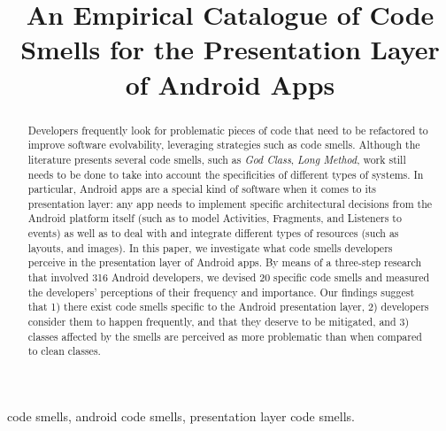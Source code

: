 \documentclass[conference]{IEEEtran}
\begin{document}
\title{An Empirical Catalogue of Code Smells for the Presentation Layer of Android Apps}

\author{
\and
{}
\and
{}
}

\maketitle

\begin{abstract} 

Developers frequently look for problematic pieces of code that need to be refactored to improve software evolvability, leveraging strategies such as code smells. Although
the literature presents several code smells, such as \textit{God Class}, \textit{Long Method}, work still needs to be done to take into account the specificities of different types of systems. In particular, Android apps are a special kind of software
when it comes to its presentation layer:
any app needs to implement specific architectural decisions from the Android
platform itself (such as to model Activities, Fragments, and Listeners to events) 
as well as to deal with and integrate different types of resources (such as layouts, and images).
In this paper, we investigate what code smells developers perceive in the presentation
layer of Android apps. By means of a three-step research that involved 316 Android developers,
we devised 20 specific code smells and measured the developers' perceptions of their frequency and importance.
Our findings suggest that 1) there exist code smells specific to the Android presentation layer, 
2) developers consider them to happen frequently, and that they deserve to be mitigated, and 
3) classes affected by the smells are perceived as more problematic than when compared to clean
classes. 


\end{abstract}

\begin{IEEEkeywords}
code smells, android code smells, presentation layer code smells.
\end{IEEEkeywords}











\end{document}
